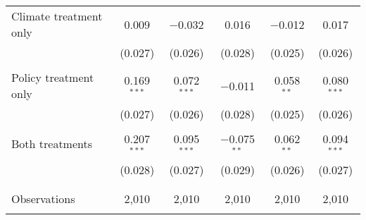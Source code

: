 \begin{tabular}{@{\extracolsep{5pt}}lccccc}
 Climate treatment only & 0.009 & $-$0.032 & 0.016 & $-$0.012 & 0.017 \\ 
  & (0.027) & (0.026) & (0.028) & (0.025) & (0.026) \\ 
  & & & & & \\ 
 Policy treatment only & 0.169$^{***}$ & 0.072$^{***}$ & $-$0.011 & 0.058$^{**}$ & 0.080$^{***}$ \\ 
  & (0.027) & (0.026) & (0.028) & (0.025) & (0.026) \\ 
  & & & & & \\ 
 Both treatments & 0.207$^{***}$ & 0.095$^{***}$ & $-$0.075$^{**}$ & 0.062$^{**}$ & 0.094$^{***}$ \\ 
  & (0.028) & (0.027) & (0.029) & (0.026) & (0.027) \\ 
  & & & & & \\ 
\hline \\[-1.8ex] 

Observations & 2,010 & 2,010 & 2,010 & 2,010 & 2,010 \\ 
\hline 
\hline \\[-1.8ex] 
\end{tabular} 